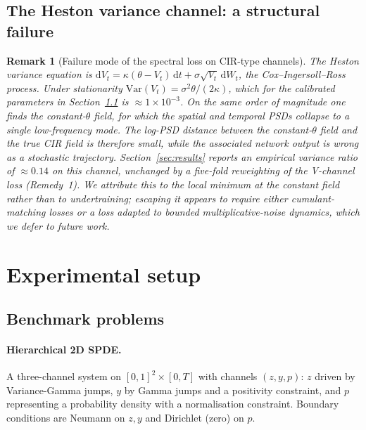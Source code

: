 \documentclass[review,12pt]{elsarticle}
\newtheorem{remark}{Remark}
\begin{document}
\subsection{The Heston variance channel: a structural failure}

\begin{remark}[Failure mode of the spectral loss on CIR-type channels]
\label{rem:cir}
The Heston variance equation is
\(\mathrm dV_t = \kappa(\theta - V_t)\,\mathrm dt
+ \sigma \sqrt{V_t}\,\mathrm dW_t\), the Cox--Ingersoll--Ross
process. Under stationarity
\(\mathrm{Var}(V_t) = \sigma^2 \theta / (2\kappa)\), which for the
calibrated parameters in Section~\ref{subsec:problems} is
\(\approx 1\!\times\!10^{-3}\). On the same order of magnitude one
finds the constant-\(\theta\) field, for which the spatial and
temporal PSDs collapse to a single low-frequency mode. The log-PSD
distance between the constant-\(\theta\) field and the true CIR
field is therefore small, while the associated network output is
wrong as a stochastic trajectory. Section~\ref{sec:results}
reports an empirical variance ratio of \(\approx 0.14\) on this
channel, unchanged by a five-fold reweighting of the V-channel
loss (Remedy~1). We attribute this to the local minimum at the
constant field rather than to undertraining; escaping it appears
to require either cumulant-matching losses or a loss adapted to
bounded multiplicative-noise dynamics, which we defer to future
work.
\end{remark}

\section{Experimental setup}
\label{sec:setup}

\subsection{Benchmark problems}
\label{subsec:problems}

\paragraph{Hierarchical 2D SPDE.}
A three-channel system on \([0,1]^2 \times [0, T]\) with channels
\((z, y, p)\): \(z\) driven by Variance-Gamma jumps, \(y\) by
Gamma jumps and a positivity constraint, and \(p\) representing a
probability density with a normalisation constraint. Boundary
conditions are Neumann on \(z, y\) and Dirichlet (zero) on \(p\).
\end{document}

